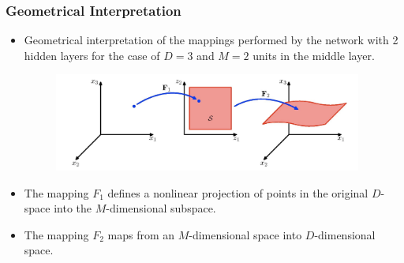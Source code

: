\documentclass[11pt,handout,aspectratio=169]{beamer}
\begin{document}
\begin{frame}
  \frametitle{Geometrical Interpretation}

  \begin{itemize}
  \item Geometrical interpretation of the mappings performed by the network with 2 hidden layers for the case of $D=3$ and $M=2$ units in the middle layer.
    \begin{figure}
      \centering
      \includegraphics[width=3.99in]{pics/geo-inter.png}
    \end{figure}
  \item The mapping $F_1$ defines a nonlinear projection of points in the original $D$-space into the $M$-dimensional subspace.
  \item The mapping $F_2$ maps from an $M$-dimensional space into $D$-dimensional space.
  \end{itemize}
\end{frame}
\end{document}
